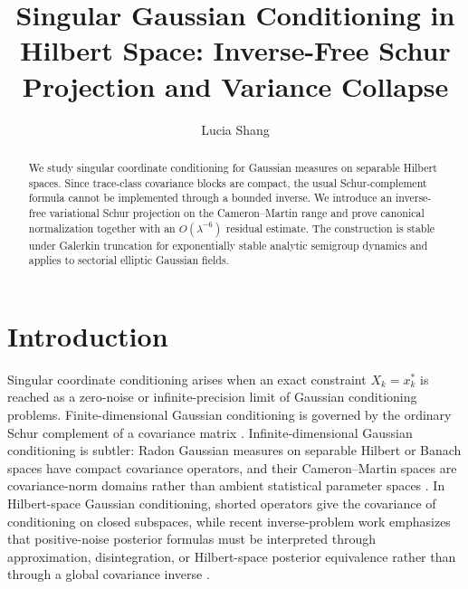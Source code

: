 \documentclass[11pt]{amsart}
\title[Singular Gaussian Conditioning in Hilbert Space]{Singular Gaussian Conditioning in Hilbert Space: Inverse-Free Schur Projection and Variance Collapse}
\author{Lucia Shang}
\theoremstyle{plain}
\theoremstyle{definition}
\theoremstyle{remark}
\begin{document}
\begin{abstract}
We study singular coordinate conditioning for Gaussian measures on separable Hilbert spaces. Since trace-class covariance blocks are compact, the usual Schur-complement formula cannot be implemented through a bounded inverse. We introduce an inverse-free variational Schur projection on the Cameron--Martin range and prove canonical normalization together with an $O(\lambda^{-6})$ residual estimate. The construction is stable under Galerkin truncation for exponentially stable analytic semigroup dynamics and applies to sectorial elliptic Gaussian fields.
\end{abstract}


\maketitle

\section{Introduction}
\label{sec:intro}

Singular coordinate conditioning arises when an exact constraint $X_k=x_k^*$ is reached as a zero-noise or infinite-precision limit of Gaussian conditioning problems.  Finite-dimensional Gaussian conditioning is governed by the ordinary Schur complement of a covariance matrix \cite{horn2012matrix,rasmussen2006gaussian}.  Infinite-dimensional Gaussian conditioning is subtler: Radon Gaussian measures on separable Hilbert or Banach spaces have compact covariance operators, and their Cameron--Martin spaces are covariance-norm domains rather than ambient statistical parameter spaces \cite{bogachev1998gaussian,daprato2014stochastic,steinwart2024conditioning}.  In Hilbert-space Gaussian conditioning, shorted operators give the covariance of conditioning on closed subspaces, while recent inverse-problem work emphasizes that positive-noise posterior formulas must be interpreted through approximation, disintegration, or Hilbert-space posterior equivalence rather than through a global covariance inverse \cite{owhadi2015conditioning,stuart2010inverse,chen2024gaussian,carerelie2024optimal,carerelie2025posterior}.
\end{document}
